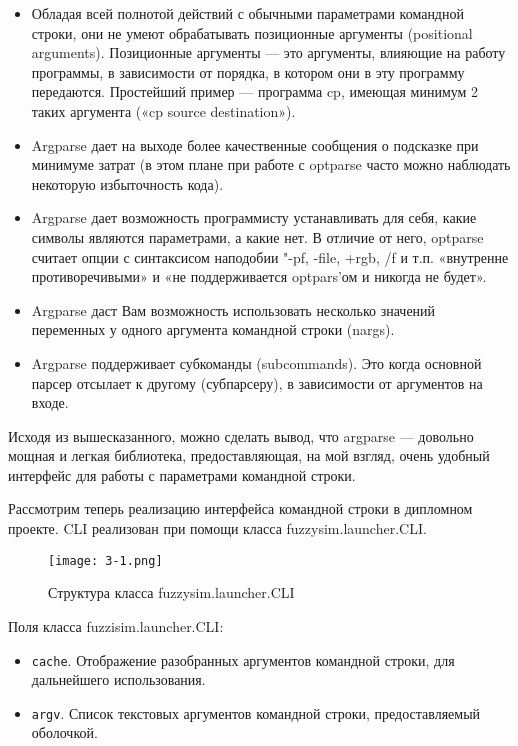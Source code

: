 \begin{itemize}
	\item Обладая всей полнотой действий с обычными параметрами командной строки, они не умеют обрабатывать позиционные аргументы (positional arguments). Позиционные аргументы — это аргументы, влияющие на работу программы, в зависимости от порядка, в котором они в эту программу передаются. Простейший пример — программа cp, имеющая минимум 2 таких аргумента («cp source destination»).
	\item Argparse дает на выходе более качественные сообщения о подсказке при минимуме затрат (в этом плане при работе с optparse часто можно наблюдать некоторую избыточность кода).
	\item Argparse дает возможность программисту устанавливать для себя, какие символы являются параметрами, а какие нет. В отличие от него, optparse считает опции с синтаксисом наподобии "-pf, -file, +rgb, /f и т.п. «внутренне противоречивыми» и «не поддерживается optpars'ом и никогда не будет».
	\item Argparse даст Вам возможность использовать несколько значений переменных у одного аргумента командной строки (nargs).
	\item Argparse поддерживает субкоманды (subcommands). Это когда основной парсер отсылает к другому (субпарсеру), в зависимости от аргументов на входе.
\end{itemize}

Исходя из вышесказанного, можно сделать вывод, что argparse — довольно мощная и легкая библиотека, предоставляющая, на мой взгляд, очень удобный интерфейс для работы с параметрами командной строки.

Рассмотрим теперь реализацию интерфейса командной строки в дипломном проекте. CLI реализован при помощи класса fuzzysim.launcher.CLI.

\begin{figure}[ht]
  \centering
  \texttt{[image: 3-1.png]}
  \caption{ Структура класса fuzzysim.launcher.CLI }
  \label{fig:func:1}
\end{figure}

Поля класса fuzzisim.launcher.CLI:
\begin{itemize}
  \item \lstinline!cache!. Отображение разобранных аргументов командной строки, для дальнейшего использования.
  \item \lstinline!argv!. Список текстовых аргументов командной строки, предоставляемый оболочкой.
\end{itemize}

